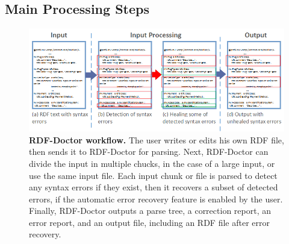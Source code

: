 



\subsection{Main Processing Steps}

\begin{figure}
	\centering
	  	\includegraphics[width=1\textwidth]{images/Approach.png}
		\caption{\textbf{RDF-Doctor workflow.} The user writes or edits his own RDF file, then sends it to RDF-Doctor for parsing.
		Next, RDF-Doctor can divide the input in multiple chucks, in the case of a large input, or use the same input file. 
		Each input chunk or file is parsed to detect any syntax errors if they exist, then it recovers a subset of detected errors, if the automatic error recovery feature is enabled by the user. 
		Finally, RDF-Doctor outputs a parse tree, a correction report, an error report, and an output file, including an RDF file after error recovery.}
		\label{Fig:Approach}  
\end{figure}

